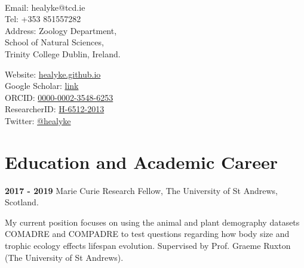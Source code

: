 \documentclass[10pt,a4paper]{article}
\begin{document}
\par{\smallskip\par}

\large{}\\
\smallskip

\par{\normalsize{}\bigskip\par}


\begin{minipage}[t]{0.5\textwidth}
\raggedright

Email:  healyke@tcd.ie\\
Tel: \hspace{0mm}+353 851557282\\
Address: Zoology Department,\\
\hspace{0mm}School of Natural Sciences,\\
\hspace{0mm}Trinity College Dublin, Ireland.\\ 


\end{minipage}
\begin{minipage}[t]{0.45\textwidth}

Website: \href{http://healyke.github.io}{healyke.github.io}\\
Google Scholar: \href{http://scholar.google.com/citations?user=5Kb9u8EAAAAJ}{link}\\
ORCID: \href{http://orcid.org/0000-0002-3548-6253}{0000-0002-3548-6253}\\
ResearcherID: \href{http://www.researcherid.com/rid/H-6512-2013}{H-6512-2013}\\
Twitter: \href{https://twitter.com/healyke}{@healyke}\\
\end{minipage}

\bigskip

\section{Education and Academic Career}

\raggedright	
\textbf{2017 - 2019} Marie Curie Research Fellow, The University of St Andrews, Scotland.
 \smallskip
\par{\fontsize{10.5}{10} My current position focuses on using the animal and plant demography datasets COMADRE and COMPADRE to test questions regarding how body size and trophic ecology effects lifespan evolution. Supervised by Prof. Graeme Ruxton (The University of St Andrews).\bigskip}
\end{document}
